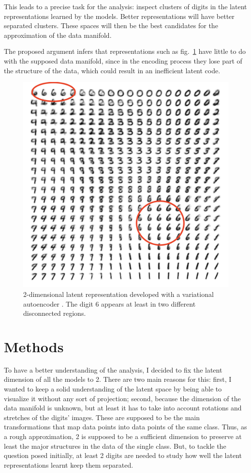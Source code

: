 \documentclass[twocolumn,gsifonts,twoside]{gsipaper}
\begin{document}
This leads to a precise task for the analysis: inspect clusters of digits in the latent representations learned by the models. Better representations will have better separated clusters. These spaces will then be the best candidates for the approximation of the data manifold.

The proposed argument infers that representations such as fig.~\ref{fig:vae} have little to do with the supposed data manifold, since in the encoding process they lose part of the structure of the data, which could result in an inefficient latent code.

\begin{figure}
  \centering
  \includegraphics[width=.6\linewidth]{image_from_vae.png}
  \caption{2-dimensional latent representation developed with a variational autoencoder \cite{Kingma2022}. The digit 6 appears at least in two different disconnected regions.}
  \label{fig:vae}
\end{figure}


\section{Methods}
To have a better understanding of the analysis, I decided to fix the latent dimension of all the models to 2. There are two main reasons for this: first, I wanted to keep a solid understanding of the latent space by being able to visualize it without any sort of projection; second, because the dimension of the data manifold is unknown, but at least it has to take into account rotations and stretches of the digits' images. These are supposed to be the main transformations that map data points into data points of the same class. Thus, as a rough approximation, 2 is supposed to be a sufficient dimension to preserve at least the major structures in the data of the single class. But, to tackle the question posed initially, at least 2 digits are needed to study how well the latent representations learnt keep them separated.
\end{document}
